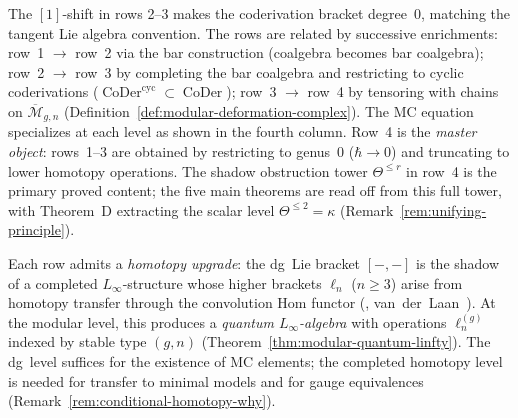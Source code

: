 \begin{remark}
The $[1]$-shift in rows 2--3 makes the coderivation bracket
degree~$0$, matching the tangent Lie algebra convention.
The rows are related by successive enrichments:
row~1 $\to$ row~2 via the bar construction (coalgebra
becomes bar coalgebra);
row~2 $\to$ row~3 by completing the bar coalgebra and
restricting to cyclic coderivations
($\operatorname{CoDer}^{\mathrm{cyc}} \subset
\operatorname{CoDer}$);
row~3 $\to$ row~4 by tensoring with chains on
$\overline{\mathcal{M}}_{g,n}$
(Definition~\ref{def:modular-deformation-complex}).
The MC equation specializes at each level as shown in the
fourth column. Row~4 is the \emph{master object}: rows~1--3 are
obtained by restricting to genus~$0$ ($\hbar \to 0$) and truncating
to lower homotopy operations. The shadow obstruction tower
$\Theta^{\leq r}$ in row~4 is the primary proved content;
the five main theorems are read off from this full tower, with
Theorem~D extracting the scalar level $\Theta^{\leq 2} = \kappa$
(Remark~\ref{rem:unifying-principle}).

Each row admits a \emph{homotopy upgrade}: the dg~Lie bracket
$[-,-]$ is the shadow of a completed $L_\infty$-structure whose higher
brackets $\ell_n$ ($n \ge 3$) arise from homotopy transfer through
the convolution Hom functor
(\cite[Theorem~10.3.8]{LV12}, van~der~Laan~\cite{vdL03}). At the
modular level, this produces a \emph{quantum $L_\infty$-algebra}
with operations $\ell_n^{(g)}$ indexed by stable type $(g,n)$
(Theorem~\ref{thm:modular-quantum-linfty}). The dg~level suffices
for the existence of MC elements; the completed homotopy level is
needed for transfer to minimal models and for gauge equivalences
(Remark~\ref{rem:conditional-homotopy-why}).
\end{remark}

